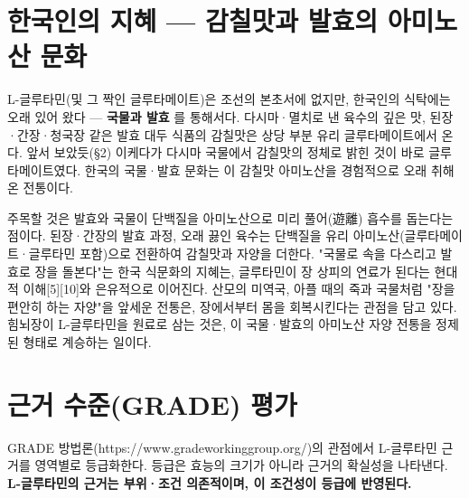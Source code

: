 \documentclass[11pt,oneside]{book}
\begin{document}
\section{한국인의 지혜 — 감칠맛과 발효의 아미노산 문화}
L-글루타민(및 그 짝인 글루타메이트)은 조선의 본초서에 없지만, 한국인의 식탁에는 오래 있어 왔다 — \textbf{국물과 발효} 를 통해서다. 다시마·멸치로 낸 육수의 깊은 맛, 된장·간장·청국장 같은 발효 대두 식품의 감칠맛은 상당 부분 유리 글루타메이트에서 온다. 앞서 보았듯(§2) 이케다가 다시마 국물에서 감칠맛의 정체로 밝힌 것이 바로 글루타메이트였다. 한국의 국물·발효 문화는 이 감칠맛 아미노산을 경험적으로 오래 취해 온 전통이다.

주목할 것은 발효와 국물이 단백질을 아미노산으로 미리 풀어(遊離) 흡수를 돕는다는 점이다. 된장·간장의 발효 과정, 오래 끓인 육수는 단백질을 유리 아미노산(글루타메이트·글루타민 포함)으로 전환하여 감칠맛과 자양을 더한다. "국물로 속을 다스리고 발효로 장을 돌본다"는 한국 식문화의 지혜는, 글루타민이 장 상피의 연료가 된다는 현대적 이해[5][10]와 은유적으로 이어진다. 산모의 미역국, 아플 때의 죽과 국물처럼 "장을 편안히 하는 자양"을 앞세운 전통은, 장에서부터 몸을 회복시킨다는 관점을 담고 있다. 힘뇌장이 L-글루타민을 원료로 삼는 것은, 이 국물·발효의 아미노산 자양 전통을 정제된 형태로 계승하는 일이다.

\section{근거 수준(GRADE) 평가}
GRADE 방법론(https://www.gradeworkinggroup.org/)의 관점에서 L-글루타민 근거를 영역별로 등급화한다. 등급은 효능의 크기가 아니라 근거의 확실성을 나타낸다. \textbf{L-글루타민의 근거는 부위·조건 의존적이며, 이 조건성이 등급에 반영된다.}

\vspace{2pt}\vspace{3pt}
\end{document}
